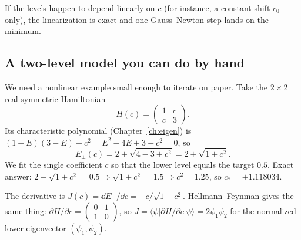 If the levels happen to depend linearly on $c$ (for instance, a constant shift $c_0$ only), the linearization is exact and one Gauss--Newton step lands on the minimum.

\subsection{A two-level model you can do by hand}

We need a nonlinear example small enough to iterate on paper. Take the $2\times2$ real symmetric Hamiltonian
\[
H(c)=\begin{pmatrix}1&c\\ c&3\end{pmatrix}.
\]
Its characteristic polynomial (Chapter~\ref{ch:eigen}) is $(1-E)(3-E)-c^2=E^2-4E+3-c^2=0$, so
\[
E_\pm(c)=2\pm\sqrt{4-3+c^2}=2\pm\sqrt{1+c^2}.
\]
We fit the single coefficient $c$ so that the lower level equals the target $0.5$. Exact answer: $2-\sqrt{1+c^2}=0.5\Rightarrow\sqrt{1+c^2}=1.5\Rightarrow c^2=1.25$, so $c_*=\pm1.118034$.

The derivative is $J(c)=\dd E_-/\dd c=-c/\sqrt{1+c^2}$. Hellmann--Feynman gives the same thing: $\partial H/\partial c=\begin{pmatrix}0&1\\1&0\end{pmatrix}$, so $J=\langle\psi|\partial H/\partial c|\psi\rangle=2\psi_1\psi_2$ for the normalized lower eigenvector $(\psi_1,\psi_2)$.

